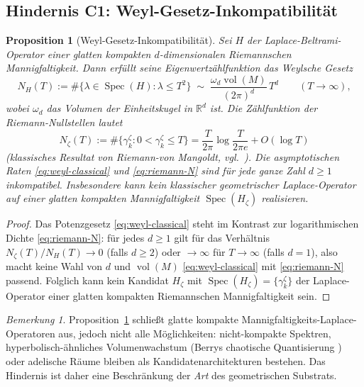 \documentclass[11pt]{article}
\newtheorem{proposition}[theorem]{Proposition}
\theoremstyle{definition}
\theoremstyle{remark}
\newtheorem{remark}[theorem]{Bemerkung}
\newcommand{\Spec}{\operatorname{Spec}}
\begin{document}
\subsection{Hindernis C1: Weyl-Gesetz-Inkompatibilität}
\label{sec:obs-C1}

\begin{proposition}[Weyl-Gesetz-Inkompatibilität]\label{prop:weyl-obstruction}
Sei $H$ der Laplace-Beltrami-Operator einer glatten kompakten
$d$-dimensionalen Riemannschen Mannigfaltigkeit. Dann erfüllt seine Eigenwertzählfunktion
das Weylsche Gesetz
\begin{equation}
\label{eq:weyl-classical}
  N_H(T) := \#\{\lambda \in \Spec(H) : \lambda \leq T^2\}
  \;\sim\; \frac{\omega_d \operatorname{vol}(M)}{(2\pi)^d}\,T^d
  \qquad (T \to \infty),
\end{equation}
wobei $\omega_d$ das Volumen der Einheitskugel in $\mathbb{R}^d$ ist. Die
Zählfunktion der Riemann-Nullstellen lautet
\begin{equation}
\label{eq:riemann-N}
  N_\zeta(T) := \#\{\gamma_k^\zeta : 0 < \gamma_k^\zeta \leq T\}
  =
  \frac{T}{2\pi}\log\!\frac{T}{2\pi e} + O(\log T)
\end{equation}
(klassisches Resultat von Riemann-von Mangoldt, vgl.\ \cite[\S9.4]{Titchmarsh1986}).
Die asymptotischen Raten \eqref{eq:weyl-classical} und
\eqref{eq:riemann-N} sind für jede ganze Zahl $d \geq 1$ inkompatibel.
Insbesondere kann kein klassischer geometrischer Laplace-Operator auf einer glatten kompakten
Mannigfaltigkeit $\Spec(H_\zeta)$ realisieren.
\end{proposition}

\begin{proof}
Das Potenzgesetz \eqref{eq:weyl-classical} steht im Kontrast zur
logarithmischen Dichte \eqref{eq:riemann-N}: für jedes $d \geq 1$ gilt für
das Verhältnis $N_\zeta(T) / N_H(T) \to 0$ (falls $d \geq 2$) oder $\to \infty$ für
$T \to \infty$ (falls $d = 1$), also macht keine Wahl von $d$ und $\operatorname{vol}(M)$
\eqref{eq:weyl-classical} mit \eqref{eq:riemann-N} passend.
Folglich kann kein Kandidat $H_\zeta$ mit
$\Spec(H_\zeta) = \{\gamma_k^\zeta\}$ der Laplace-Operator einer
glatten kompakten Riemannschen Mannigfaltigkeit sein.
\end{proof}

\begin{remark}\label{rem:weyl-workarounds}
Proposition~\ref{prop:weyl-obstruction} schließt glatte kompakte
Mannigfaltigkeits-Laplace-Operatoren aus, jedoch nicht alle Möglichkeiten: nicht-kompakte Spektren,
hyperbolisch-ähnliches Volumenwachstum (Berrys chaotische Quantisierung
\cite{Berry1985, BerryKeating1999}) oder adelische Räume
\cite{Connes1999, Connes2026} bleiben als Kandidatenarchitekturen bestehen. Das
Hindernis ist daher eine Beschränkung der \emph{Art} des
geometrischen Substrats.
\end{remark}
\end{document}
